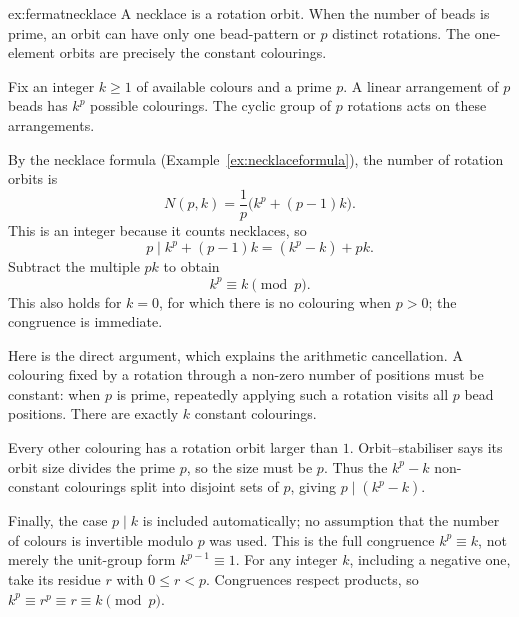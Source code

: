 \begin{solution}{ex:fermatnecklace}
\idea A necklace is a rotation orbit. When the number of beads is prime, an orbit can have only one bead-pattern or $p$ distinct rotations. The one-element orbits are precisely the constant colourings.

\writeup Fix an integer $k\ge1$ of available colours and a prime $p$. A linear arrangement of $p$ beads has $k^p$ possible colourings. The cyclic group of $p$ rotations acts on these arrangements.

By the necklace formula (Example~\ref{ex:necklaceformula}), the number of rotation orbits is
\[
N(p,k)=\frac1p\bigl(k^p+(p-1)k\bigr).
\]
This is an integer because it counts necklaces, so
\[
p\mid k^p+(p-1)k
  =(k^p-k)+pk.
\]
Subtract the multiple $pk$ to obtain
\[
\boxed{k^p\equiv k\pmod p}.
\]
This also holds for $k=0$, for which there is no colouring when $p>0$; the congruence is immediate.

Here is the direct argument, which explains the arithmetic cancellation. A colouring fixed by a rotation through a non-zero number of positions must be constant: when $p$ is prime, repeatedly applying such a rotation visits all $p$ bead positions. There are exactly $k$ constant colourings.

Every other colouring has a rotation orbit larger than $1$. Orbit--stabiliser says its orbit size divides the prime $p$, so the size must be $p$. Thus the $k^p-k$ non-constant colourings split into disjoint sets of $p$, giving $p\mid(k^p-k)$.

Finally, the case $p\mid k$ is included automatically; no assumption that the number of colours is invertible modulo $p$ was used. This is the full congruence $k^p\equiv k$, not merely the unit-group form $k^{p-1}\equiv1$.
For any integer $k$, including a negative one, take its residue $r$ with
$0\le r<p$. Congruences respect products, so
$k^p\equiv r^p\equiv r\equiv k\pmod p$.
\end{solution}

